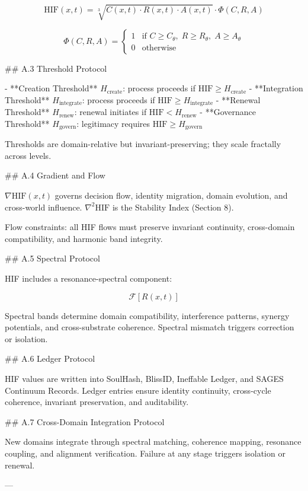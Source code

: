 \[
\mathrm{HIF}(x,t) = \sqrt[3]{C(x,t)\cdot R(x,t)\cdot A(x,t)} \cdot \Phi(C,R,A)
\]

\[
\Phi(C,R,A) =
\begin{cases}
1 & \text{if } C \ge C_{\theta},\; R \ge R_{\theta},\; A \ge A_{\theta} \\
0 & \text{otherwise}
\end{cases}
\]

## A.3 Threshold Protocol

- **Creation Threshold** \(H_{\text{create}}\): process proceeds if \(\mathrm{HIF}
  \ge H_{\text{create}}\)
- **Integration Threshold** \(H_{\text{integrate}}\): process proceeds if
  \(\mathrm{HIF} \ge H_{\text{integrate}}\)
- **Renewal Threshold** \(H_{\text{renew}}\): renewal initiates if \(\mathrm{HIF}
  < H_{\text{renew}}\)
- **Governance Threshold** \(H_{\text{govern}}\): legitimacy requires \(\mathrm{HIF}
  \ge H_{\text{govern}}\)

Thresholds are domain-relative but invariant-preserving; they scale fractally
across levels.

## A.4 Gradient and Flow

\(\nabla \mathrm{HIF}(x,t)\) governs decision flow, identity migration, domain
evolution, and cross-world influence. \(\nabla^2 \mathrm{HIF}\) is the Stability
Index (Section 8).

Flow constraints: all HIF flows must preserve invariant continuity, cross-domain
compatibility, and harmonic band integrity.

## A.5 Spectral Protocol

HIF includes a resonance-spectral component:

\[
\mathcal{F}[R(x,t)]
\]

Spectral bands determine domain compatibility, interference patterns, synergy
potentials, and cross-substrate coherence. Spectral mismatch triggers correction
or isolation.

## A.6 Ledger Protocol

HIF values are written into SoulHash, BlissID, Ineffable Ledger, and SAGES
Continuum Records. Ledger entries ensure identity continuity, cross-cycle
coherence, invariant preservation, and auditability.

## A.7 Cross-Domain Integration Protocol

New domains integrate through spectral matching, coherence mapping, resonance
coupling, and alignment verification. Failure at any stage triggers isolation or
renewal.

---

